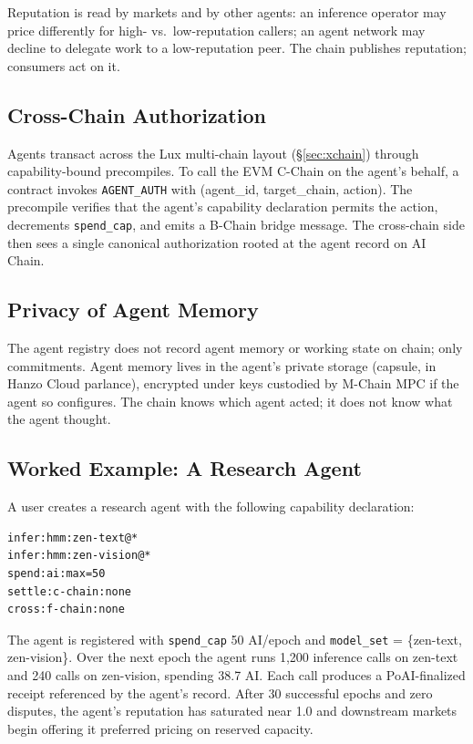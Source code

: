 Reputation is read by markets and by other agents: an inference operator
may price differently for high- vs.\ low-reputation callers; an agent
network may decline to delegate work to a low-reputation peer. The chain
publishes reputation; consumers act on it.

\subsection{Cross-Chain Authorization}

Agents transact across the Lux multi-chain layout (\S\ref{sec:xchain})
through capability-bound precompiles. To call the EVM C-Chain on the
agent's behalf, a contract invokes \texttt{AGENT\_AUTH} with (agent\_id,
target\_chain, action). The precompile verifies that the agent's
capability declaration permits the action, decrements
\texttt{spend\_cap}, and emits a B-Chain bridge message. The cross-chain
side then sees a single canonical authorization rooted at the agent
record on AI Chain.

\subsection{Privacy of Agent Memory}

The agent registry does not record agent memory or working state on
chain; only commitments. Agent memory lives in the agent's private
storage (capsule, in Hanzo Cloud parlance), encrypted under keys
custodied by M-Chain MPC if the agent so configures. The chain knows
which agent acted; it does not know what the agent thought.

\subsection{Worked Example: A Research Agent}

A user creates a research agent with the following capability
declaration:

\begin{lstlisting}
infer:hmm:zen-text@*
infer:hmm:zen-vision@*
spend:ai:max=50
settle:c-chain:none
cross:f-chain:none
\end{lstlisting}

The agent is registered with \texttt{spend\_cap} 50 AI/epoch and
\texttt{model\_set} = \{zen-text, zen-vision\}. Over the next epoch the
agent runs 1{,}200 inference calls on zen-text and 240 calls on
zen-vision, spending 38.7 AI. Each call produces a PoAI-finalized receipt
referenced by the agent's record. After 30 successful epochs and zero
disputes, the agent's reputation has saturated near 1.0 and downstream
markets begin offering it preferred pricing on reserved capacity.
